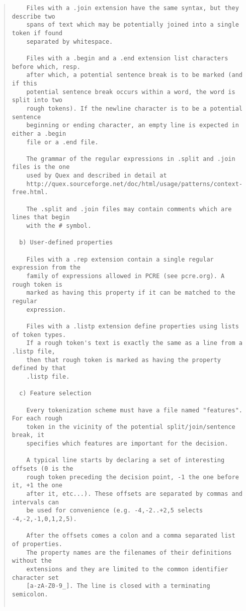 \begin{scriptsize}
\begin{quote}
\begin{verbatim}
    Files with a .join extension have the same syntax, but they describe two
    spans of text which may be potentially joined into a single token if found
    separated by whitespace.

    Files with a .begin and a .end extension list characters before which, resp.
    after which, a potential sentence break is to be marked (and if this
    potential sentence break occurs within a word, the word is split into two
    rough tokens). If the newline character is to be a potential sentence
    beginning or ending character, an empty line is expected in either a .begin
    file or a .end file.

    The grammar of the regular expressions in .split and .join files is the one
    used by Quex and described in detail at
    http://quex.sourceforge.net/doc/html/usage/patterns/context-free.html.

    The .split and .join files may contain comments which are lines that begin
    with the # symbol.

  b) User-defined properties

    Files with a .rep extension contain a single regular expression from the
    family of expressions allowed in PCRE (see pcre.org). A rough token is
    marked as having this property if it can be matched to the regular
    expression.

    Files with a .listp extension define properties using lists of token types.
    If a rough token's text is exactly the same as a line from a .listp file,
    then that rough token is marked as having the property defined by that
    .listp file.

  c) Feature selection

    Every tokenization scheme must have a file named "features". For each rough
    token in the vicinity of the potential split/join/sentence break, it
    specifies which features are important for the decision.

    A typical line starts by declaring a set of interesting offsets (0 is the
    rough token preceding the decision point, -1 the one before it, +1 the one
    after it, etc...). These offsets are separated by commas and intervals can
    be used for convenience (e.g. -4,-2..+2,5 selects -4,-2,-1,0,1,2,5).

    After the offsets comes a colon and a comma separated list of properties.
    The property names are the filenames of their definitions without the
    extensions and they are limited to the common identifier character set
    [a-zA-Z0-9_]. The line is closed with a terminating semicolon.


\end{verbatim}
\end{quote}
\end{scriptsize}
